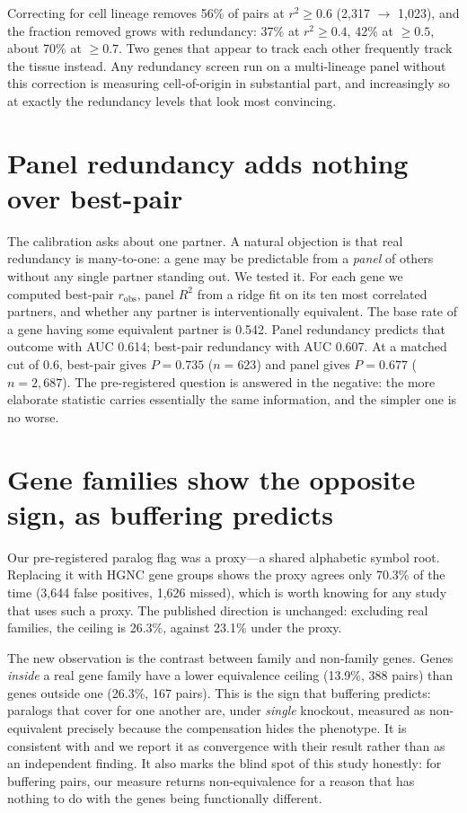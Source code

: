 \documentclass[11pt]{article}
\begin{document}
Correcting for cell lineage removes 56\% of pairs at $r^2 \ge 0.6$
(2,317 $\rightarrow$ 1,023), and the fraction removed grows with redundancy:
37\% at $r^2 \ge 0.4$, 42\% at $\ge 0.5$, about 70\% at $\ge 0.7$. Two genes
that appear to track each other frequently track the tissue instead. Any
redundancy screen run on a multi-lineage panel without this correction is
measuring cell-of-origin in substantial part, and increasingly so at exactly
the redundancy levels that look most convincing.

\section{Panel redundancy adds nothing over best-pair}

The calibration asks about one partner. A natural objection is that real
redundancy is many-to-one: a gene may be predictable from a \emph{panel} of
others without any single partner standing out. We tested it. For each gene
we computed best-pair $r_{\mathrm{obs}}$, panel $R^2$ from a ridge fit on its
ten most correlated partners, and whether any partner is interventionally
equivalent. The base rate of a gene having some equivalent partner is 0.542.
Panel redundancy predicts that outcome with AUC 0.614; best-pair redundancy
with AUC 0.607. At a matched cut of 0.6, best-pair gives $P = 0.735$
($n = 623$) and panel gives $P = 0.677$ ($n = 2{,}687$). The
pre-registered question is answered in the negative: the more elaborate
statistic carries essentially the same information, and the simpler one is
no worse.

\section{Gene families show the opposite sign, as buffering predicts}
\label{sec:families}

Our pre-registered paralog flag was a proxy---a shared alphabetic symbol
root. Replacing it with HGNC gene groups shows the proxy agrees only 70.3\%
of the time (3,644 false positives, 1,626 missed), which is worth knowing
for any study that uses such a proxy. The published direction is unchanged:
excluding real families, the ceiling is 26.3\%, against 23.1\% under the
proxy.

The new observation is the contrast between family and non-family genes.
Genes \emph{inside} a real gene family have a lower equivalence ceiling
(13.9\%, 388 pairs) than genes outside one (26.3\%, 167 pairs). This is the
sign that buffering predicts: paralogs that cover for one another are, under
\emph{single} knockout, measured as non-equivalent precisely because the
compensation hides the phenotype. It is consistent with
\citet{dekegel2019,dekegel2021} and we report it as convergence with their
result rather than as an independent finding. It also marks the blind spot
of this study honestly: for buffering pairs, our measure returns
non-equivalence for a reason that has nothing to do with the genes being
functionally different.
\end{document}
